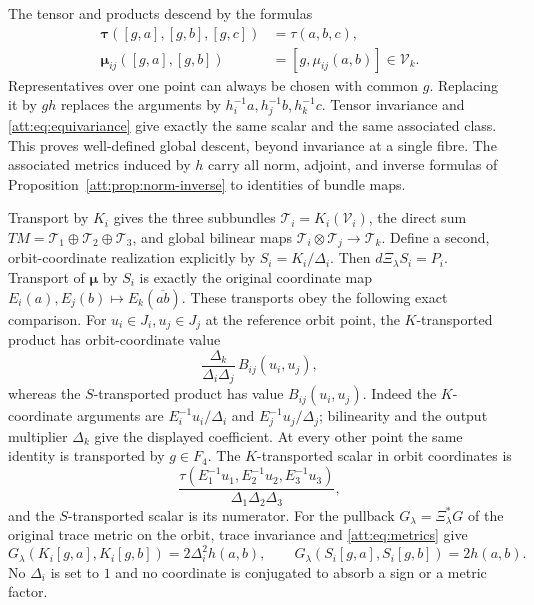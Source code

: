 \documentclass[11pt]{article}
\theoremstyle{definition}
\begin{document}
The tensor and products descend by the formulas
\begin{align}
 \boldsymbol\tau([g,a],[g,b],[g,c])&=\tau(a,b,c),\nonumber\\
 \boldsymbol\mu_{ij}([g,a],[g,b])&=[g,\mu_{ij}(a,b)]
                                  \in\mathcal V_k.
 \label{att:eq:descent}
\end{align}
Representatives over one point can always be chosen with common $g$.
Replacing it by $gh$ replaces the arguments by
$h_i^{-1}a,h_j^{-1}b,h_k^{-1}c$.
Tensor invariance and \eqref{att:eq:equivariance} give exactly the
same scalar and the same associated class. This proves well-defined
global descent, beyond invariance at a single fibre. The associated
metrics induced by $h$ carry all norm, adjoint, and inverse formulas
of Proposition~\ref{att:prop:norm-inverse} to identities of bundle maps.

Transport by $K_i$ gives the three subbundles
$\mathcal T_i=K_i(\mathcal V_i)$, the direct sum
$TM=\mathcal T_1\oplus\mathcal T_2\oplus\mathcal T_3$, and global
bilinear maps $\mathcal T_i\otimes\mathcal T_j\to\mathcal T_k$.
Define a second, orbit-coordinate realization explicitly by
$S_i=K_i/\Delta_i$. Then $d\Xi_\lambda S_i=P_i$.
Transport of $\boldsymbol\mu$ by $S_i$ is exactly the original
coordinate map $E_i(a),E_j(b)\mapsto E_k(\overline{ab})$.
These transports obey the following exact comparison. For
$u_i\in J_i,u_j\in J_j$ at the reference orbit point, the
$K$-transported product has orbit-coordinate value
\begin{equation}
 \frac{\Delta_k}{\Delta_i\Delta_j}\,B_{ij}(u_i,u_j),
 \label{att:eq:tangent-scale-products}
\end{equation}
whereas the $S$-transported product has value $B_{ij}(u_i,u_j)$.
Indeed the $K$-coordinate arguments are
$E_i^{-1}u_i/\Delta_i$ and $E_j^{-1}u_j/\Delta_j$; bilinearity and
the output multiplier $\Delta_k$ give the displayed coefficient.
At every other point the same identity is transported by $g\in F_4$.
The $K$-transported scalar in orbit coordinates is
\[
 \frac{\tau(E_1^{-1}u_1,E_2^{-1}u_2,E_3^{-1}u_3)}
             {\Delta_1\Delta_2\Delta_3},
\]
and the $S$-transported scalar is its numerator.
For the pullback $G_\lambda=\Xi_\lambda^*G$ of the original trace
metric on the orbit, trace invariance and \eqref{att:eq:metrics} give
\[
 G_\lambda(K_i[g,a],K_i[g,b])=2\Delta_i^2h(a,b),\qquad
 G_\lambda(S_i[g,a],S_i[g,b])=2h(a,b).
\]
No $\Delta_i$ is set to $1$ and no coordinate is conjugated to absorb
a sign or a metric factor.
\end{document}
